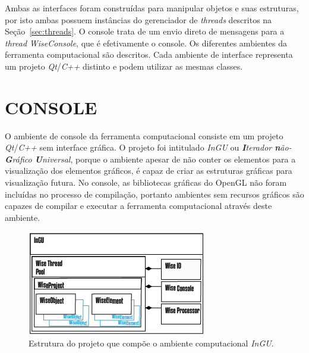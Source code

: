 Ambas as interfaces foram construídas para manipular objetos e suas estruturas, por isto ambas possuem instâncias do gerenciador de \textit{threads} descritos na Seção~\ref{sec:threads}. O console trata de um envio direto de mensagens para a \textit{thread} \textit{WiseConsole}, que é efetivamente o console. Os diferentes ambientes da ferramenta computacional são descritos. Cada ambiente de interface representa um projeto \textit{Qt}/\textit{C++} distinto e podem utilizar as mesmas classes.

\section{CONSOLE}\label{sec:console}

O ambiente de console da ferramenta computacional consiste em um projeto \textit{Qt}/\textit{C++} sem interface gráfica. O projeto foi intitulado \textit{InGU} ou \textit{\textbf{I}terador \textbf{n}ão-\textbf{G}ráfico \textbf{U}niversal}, porque o ambiente apesar de não conter os elementos para a visualização dos elementos gráficos, é capaz de criar as estruturas gráficas para visualização futura.  No console, as bibliotecas gráficas do OpenGL não foram incluídas no processo de compilação, portanto ambientes sem recursos gráficos são capazes de compilar e executar a ferramenta computacional através deste ambiente.

\begin{figure}[!htbp]
	\centering
	\includegraphics[width=\linewidth]{Figures/InGU.png}
	\caption{Estrutura do projeto que compõe o ambiente computacional \textit{InGU}.}
	\label{fig10:console}
\end{figure}

